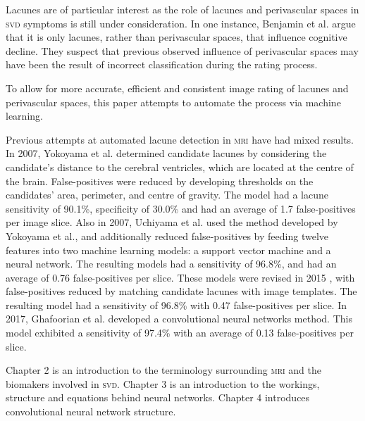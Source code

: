Lacunes are of particular interest as the role of lacunes and perivascular spaces in \textsc{svd} symptoms is still under consideration. In one instance, Benjamin et al. \cite{BenjaminJ.Philip2018LIbN} argue that it is only lacunes, rather than perivascular spaces, that influence cognitive decline. They suspect that previous observed influence of perivascular spaces may have been the result of incorrect classification during the rating process.

To allow for more accurate, efficient and consistent image rating of lacunes and perivascular spaces, this paper attempts to automate the process via machine learning.

Previous attempts at automated lacune detection in \textsc{mri} have had mixed results. In 2007, Yokoyama et al. \cite{Yokoyama2007} determined candidate lacunes by considering the candidate's distance to the cerebral ventricles, which are located at the centre of the brain. False-positives were reduced by developing thresholds on the candidates' area, perimeter, and centre of gravity. The model had a lacune sensitivity of 90.1\%, specificity of 30.0\% and had an average of 1.7 false-positives per image slice. Also in 2007, Uchiyama et al. \cite{Uchiyama2007b, Uchiyama20071554} used the method developed by Yokoyama et al., and additionally reduced false-positives by feeding twelve features into two machine learning models: a support vector machine and a neural network. The resulting models had a sensitivity of 96.8\%, and had an average of 0.76 false-positives per slice. These models were revised in 2015 \cite{Uchiyama2015}, with false-positives reduced by matching candidate lacunes with image templates. The resulting model had a sensitivity of 96.8\% with 0.47 false-positives per slice. In 2017, Ghafoorian et al. \cite{GhafoorianM.2017Dml3} developed a convolutional neural networks method. This model exhibited a sensitivity of 97.4\% with an average of 0.13 false-positives per slice.

Chapter 2 is an introduction to the terminology surrounding \textsc{mri} and the biomakers involved in \textsc{svd}. Chapter 3 is an introduction to the workings, structure and equations behind neural networks. Chapter 4 introduces convolutional neural network structure.

%
%
%





%
